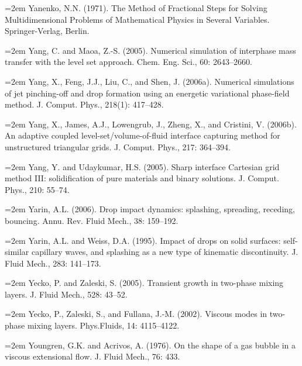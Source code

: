 \documentclass[11pt,a4paper,openany,fontset=none]{ctexbook}
\begin{document}
\par\hangindent=2em Yanenko, N.N. (1971). The Method of Fractional Steps for Solving Multidimensional Problems of Mathematical Physics in Several Variables. Springer-Verlag, Berlin.

\par\hangindent=2em Yang, C. and Maoa, Z.-S. (2005). Numerical simulation of interphase mass transfer with the level set approach. Chem. Eng. Sci., 60: 2643--2660.

\par\hangindent=2em Yang, X., Feng, J.J., Liu, C., and Shen, J. (2006a). Numerical simulations of jet pinching-off and drop formation using an energetic variational phase-field method. J. Comput. Phys., 218(1): 417--428.

\par\hangindent=2em Yang, X., James, A.J., Lowengrub, J., Zheng, X., and Cristini, V. (2006b). An adaptive coupled level-set/volume-of-fluid interface capturing method for unstructured triangular grids. J. Comput. Phys., 217: 364--394.


\par\hangindent=2em Yang, Y. and Udaykumar, H.S. (2005). Sharp interface Cartesian grid method III: solidification of pure materials and binary solutions. J. Comput. Phys., 210: 55--74.

\par\hangindent=2em Yarin, A.L. (2006). Drop impact dynamics: splashing, spreading, receding, bouncing. Annu. Rev. Fluid Mech., 38: 159--192.

\par\hangindent=2em Yarin, A.L. and Weiss, D.A. (1995). Impact of drops on solid surfaces: self-similar capillary waves, and splashing as a new type of kinematic discontinuity. J. Fluid Mech., 283: 141--173.

\par\hangindent=2em Yecko, P. and Zaleski, S. (2005). Transient growth in two-phase mixing layers. J. Fluid Mech., 528: 43--52.

\par\hangindent=2em Yecko, P., Zaleski, S., and Fullana, J.-M. (2002). Viscous modes in two-phase mixing layers. Phys.Fluids, 14: 4115--4122.

\par\hangindent=2em Youngren, G.K. and Acrivos, A. (1976). On the shape of a gas bubble in a viscous extensional flow. J. Fluid Mech., 76: 433.
\end{document}
